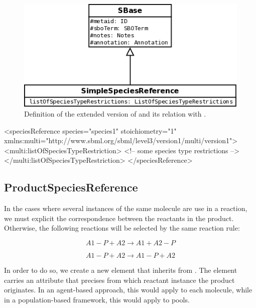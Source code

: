 \begin{figure}[H]
\begin{center}
\includegraphics[scale=0.3]{figs/pngs/SimpleSpeciesReferenceClass.png} 
\caption{Definition of the extended version of  and its relation with .}
\label{fig:SimpleSpeciesReferenceClass}
\end{center}
\end{figure}

\begin{example}
<speciesReference species="species1" stoichiometry="1"
                  xmlns:multi="http://www.sbml.org/sbml/level3/version1/multi/version1">
  <multi:listOfSpeciesTypeRestriction>
    <!-- some species type restrictions -->
  </multi:listOfSpeciesTypeRestriction>
</speciesReference>  
\end{example}

\subsection{ProductSpeciesReference}

In the cases where several instances of the same molecule are use in a reaction, we must explicit the correspondence between the reactants in the product. Otherwise, the following reactions will be selected by the same reaction rule:

\[A1-P + A2 \rightarrow A1 + A2-P\]

\[A1-P + A2 \rightarrow A1-P + A2\]

In order to do so, we create a new element  that inherits from . The element carries an attribute  that precises from which reactant instance the product originates. In an agent-based approach, this would apply to each 
molecule, while in a population-based framework, this would apply to pools. 

